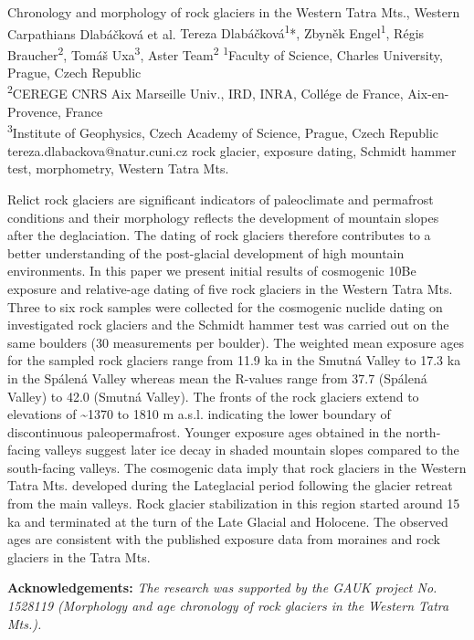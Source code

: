 
\abstract
{Chronology and morphology of rock glaciers in the Western Tatra Mts., Western Carpathians} 
{Dlabáčková et al.} 
{Tereza Dlabáčková\textsuperscript{1}*, Zbyněk Engel\textsuperscript{1}, Régis Braucher\textsuperscript{2}, Tomáš Uxa\textsuperscript{3}, Aster Team\textsuperscript{2}} 
{\POtag} 
{
\textsuperscript{1}Faculty of Science, Charles University, Prague, Czech Republic \\
\textsuperscript{2}CEREGE CNRS Aix Marseille Univ., IRD, INRA, Collége de France, Aix-en-Provence, France\\
\textsuperscript{3}Institute of Geophysics, Czech Academy of Science, Prague, Czech Republic
}
{tereza.dlabackova@natur.cuni.cz}  %
{rock glacier, exposure dating, Schmidt hammer test, morphometry, Western Tatra Mts.}
{Relict rock glaciers are significant indicators of paleoclimate and permafrost conditions and their morphology reflects the development of mountain slopes after the deglaciation. The dating of rock glaciers therefore contributes to a better understanding of the post-glacial development of high mountain environments. In this paper we present initial results of cosmogenic 10Be exposure and relative-age dating of five rock glaciers in the Western Tatra Mts. Three to six rock samples were collected for the cosmogenic nuclide dating on investigated rock glaciers and the Schmidt hammer test was carried out on the same boulders (30 measurements per boulder). The weighted mean exposure ages for the sampled rock glaciers range from 11.9 ka in the Smutná Valley to 17.3 ka in the Spálená Valley whereas mean the R-values range from 37.7 (Spálená Valley) to 42.0 (Smutná Valley). The fronts of the rock glaciers extend to elevations of \textasciitilde1370 to 1810 m a.s.l. indicating the lower boundary of discontinuous paleopermafrost. Younger exposure ages obtained in the north-facing valleys suggest later ice decay in shaded mountain slopes compared to the south-facing valleys. The cosmogenic data imply that rock glaciers in the Western Tatra Mts. developed during the Lateglacial period following the glacier retreat from the main valleys.  Rock glacier stabilization in this region started around 15 ka and terminated at the turn of the Late Glacial and Holocene. The observed ages are consistent with the published exposure data from moraines and rock glaciers in the Tatra Mts.

\vspace{0.5em}
\noindent
\textbf{Acknowledgements:}
\textit{The research was supported by the GAUK project No. 1528119 (Morphology and age chronology of rock glaciers in the Western Tatra Mts.).}
	
}
{
}

